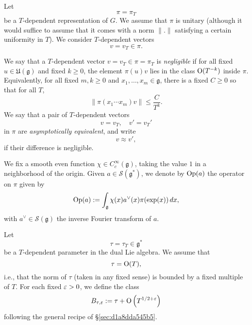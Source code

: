 \documentclass[reqno]{amsart} 
\numberwithin{equation}{section}
\numberwithin{theorem}{section}
\begin{document}
Let
\begin{equation*}
  \pi = \pi_T
\end{equation*}
be a $T$-dependent representation of $G$.  We assume that $\pi$ is unitary (although it would suffice to assume that it comes with a norm $\lVert . \rVert$ satisfying a certain uniformity in $T$).  We consider $T$-dependent vectors
\begin{equation*}
  v = v_T \in \pi.
\end{equation*}
\begin{definition}
  We say that a $T$-dependent vector $v = v_T \in \pi = \pi_T$ is \emph{negligible} if for all fixed $u \in \mathfrak{U}(\mathfrak{g})$ and fixed $k \geq 0$, the element $\pi(u) v$ lies in the class $\operatorname{O}(T^{-k})$ inside $\pi$.  Equivalently, for all fixed $m, k \geq 0$ and $x_1,\dotsc,x_m \in \mathfrak{g}$, there is a fixed $C \geq 0$ so that for all $T$,
  \begin{equation*}
    \lVert
    \pi (x_1 \dotsb x_m ) v
    \rVert
    \leq
    \frac{C}{ T^k }.
  \end{equation*}
  We say that a pair of $T$-dependent vectors
  \begin{equation*}
    v = v _T, \quad
    v' = v_T'
  \end{equation*}
  in $\pi$ are \emph{asymptotically equivalent}, and write
  \begin{equation*}
    v \approx v ',
  \end{equation*}
  if their difference is negligible.
\end{definition}

\begin{definition}
  We fix a smooth even function $\chi \in C_c^\infty(\mathfrak{g})$, taking the value $1$ in a neighborhood of the origin.  Given $a \in \mathcal{S}(\mathfrak{g}^*)$, we denote by $\operatorname{Op}(a)$ the operator on $\pi$ given by
  \begin{equation*}
    \operatorname{Op}(a) := \int_{\mathfrak{g} } \chi(x) a^\vee (x) \pi (\exp(x)) \, d x,
  \end{equation*}
  with $a^\vee \in \mathcal{S}(\mathfrak{g})$ the inverse Fourier transform of $a$.
\end{definition}


Let
\begin{equation*}
  \tau = \tau_T \in \mathfrak{g}^*
\end{equation*}
be a $T$-dependent parameter in the dual Lie algebra.  We assume that
\begin{equation*}
  \tau = \operatorname{O}(T),
\end{equation*}
i.e., that the norm of $\tau$ (taken in any fixed sense) is bounded by a fixed multiple of $T$.  For each fixed  $\varepsilon > 0$, we define the class
\begin{equation}\label{eqn:d1a8de18355b}
  B_{\tau,\varepsilon} := \tau + \operatorname{O} \left( T^{1/2 + \varepsilon } \right)
\end{equation}
following the general recipe of \S\ref{sec:d1a8dda545b5}.
\end{document}

